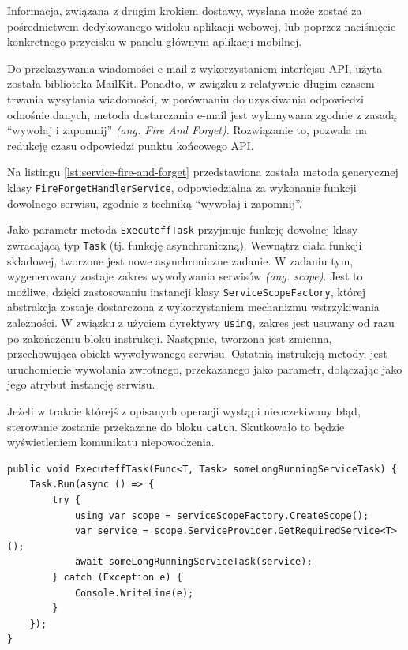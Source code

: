 Informacja, związana z drugim krokiem dostawy, wysłana może zostać za pośrednictwem dedykowanego widoku aplikacji webowej, lub poprzez naciśnięcie konkretnego przycisku w panelu głównym aplikacji mobilnej.

Do przekazywania wiadomości e-mail z wykorzystaniem interfejsu API, użyta została biblioteka MailKit. Ponadto, w związku z relatywnie długim czasem trwania wysyłania wiadomości, w porównaniu do uzyskiwania odpowiedzi odnośnie danych, metoda dostarczania e-mail jest wykonywana zgodnie z zasadą "`wywołaj i zapomnij"' \textit{(ang. Fire And Forget)}. Rozwiązanie to, pozwala na redukcję czasu odpowiedzi punktu końcowego API.

Na listingu \ref{lst:service-fire-and-forget} przedstawiona została metoda generycznej klasy \texttt{FireForgetHandlerService}, odpowiedzialna za wykonanie funkcji dowolnego serwisu, zgodnie z techniką "`wywołaj i zapomnij"'.

Jako parametr metoda \texttt{ExecuteffTask} przyjmuje funkcję dowolnej klasy zwracającą typ \texttt{Task} (tj. funkcję asynchroniczną). Wewnątrz ciała funkcji składowej, tworzone jest nowe asynchroniczne zadanie. W zadaniu tym, wygenerowany zostaje zakres wywoływania serwisów \textit{(ang. scope)}. Jest to możliwe, dzięki zastosowaniu instancji klasy \texttt{ServiceScopeFactory}, której abstrakcja zostaje dostarczona z wykorzystaniem mechanizmu wstrzykiwania zależności. W związku z użyciem dyrektywy \texttt{using}, zakres jest usuwany od razu po zakończeniu bloku instrukcji. Następnie, tworzona jest zmienna, przechowująca obiekt wywoływanego serwisu. Ostatnią instrukcją metody, jest uruchomienie wywołania zwrotnego, przekazanego jako parametr, dołączając jako jego atrybut instancję serwisu.

Jeżeli w trakcie którejś z opisanych operacji wystąpi nieoczekiwany błąd, sterowanie zostanie przekazane do bloku \texttt{catch}. Skutkowało to będzie wyświetleniem komunikatu niepowodzenia.

\begin{lstlisting}[label=lst:service-fire-and-forget,caption=Kod metody wykonującej funkcję typu "`Fire And Forget"', captionpos=b,basicstyle=\footnotesize\ttfamily,style=sharpcstyle,language={[Sharp]C}]
public void ExecuteffTask(Func<T, Task> someLongRunningServiceTask) {
	Task.Run(async () => {
		try {
			using var scope = serviceScopeFactory.CreateScope();
			var service = scope.ServiceProvider.GetRequiredService<T>();
			await someLongRunningServiceTask(service);
		} catch (Exception e) {
			Console.WriteLine(e);
		}
	});
}
\end{lstlisting}


